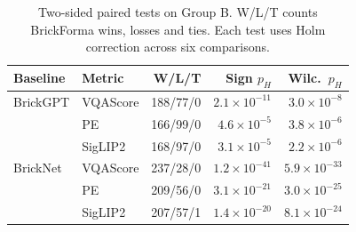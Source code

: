\begin{table}[t]
\centering\small
\setlength{\tabcolsep}{3pt}
\begin{tabular}{llrrr}
\toprule
Baseline & Metric & W/L/T & Sign $p_H$ & Wilc.\ $p_H$ \\
\midrule
BrickGPT & VQAScore & 188/77/0 & $2.1\times 10^{-11}$ & $3.0\times 10^{-8}$ \\
 & PE & 166/99/0 & $4.6\times 10^{-5}$ & $3.8\times 10^{-6}$ \\
 & SigLIP2 & 168/97/0 & $3.1\times 10^{-5}$ & $2.2\times 10^{-6}$ \\
BrickNet & VQAScore & 237/28/0 & $1.2\times 10^{-41}$ & $5.9\times 10^{-33}$ \\
 & PE & 209/56/0 & $3.1\times 10^{-21}$ & $3.0\times 10^{-25}$ \\
 & SigLIP2 & 207/57/1 & $1.4\times 10^{-20}$ & $8.1\times 10^{-24}$ \\
\bottomrule
\end{tabular}
\caption{Two-sided paired tests on Group B. W/L/T counts BrickForma wins, losses and ties. Each test uses Holm correction across six comparisons.}
\label{tab:sig}
\end{table}
